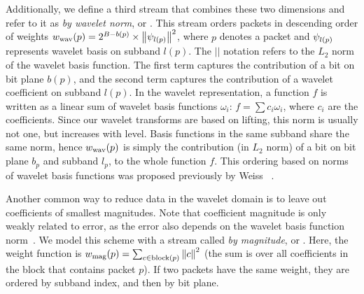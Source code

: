 Additionally, we define a third stream that combines these two dimensions and refer to it as
\emph{by wavelet norm}, or \swav. This stream orders packets in descending order of weights
$\wwav(p)=2^{B-b(p)}\times \norm{\wbas_{l(p)}}^2$, where $p$ denotes a packet and $\wbas_{l(p)}$
represents wavelet basis on subband $l(p)$. The $||$ notation refers to the $L_2$ norm of the
wavelet basis function. The first term captures the contribution of a bit on bit plane $b(p)$, and
the second term captures the contribution of a wavelet coefficient on subband $l(p)$.
%
%
In the wavelet representation, a function $f$ is written as a linear sum of wavelet basis functions
$\omega_i$: $f=\sum{c_i\omega_i}$, where $c_i$ are the coefficients. Since our wavelet transforms
are based on lifting, this norm is usually not one, but increases with level. Basis functions in the
same subband share the same norm, hence $\wwav(p)$ is simply the contribution (in $L_2$ norm) of a
bit on bit plane $b_p$ and subband $l_p$, to the whole function $f$. This ordering based on norms of
wavelet basis functions was proposed previously by Weiss \etal~\cite{weiss}.

Another common way to reduce data in the wavelet domain is to leave out coefficients of smallest
magnitudes. Note that coefficient magnitude is only weakly related to error, as the error also
depends on the wavelet basis function norm~\cite{weiss}. We model this scheme with a stream called
\emph{by magnitude}, or \smag. Here, the weight function is $\wmag(p)=\sum_{c\in
\text{block}(p)}\norm{c}^2$ (the sum is over all coefficients in the block that contains packet
$p$). If two packets have the same weight, they are ordered by subband index, and then by bit plane.


